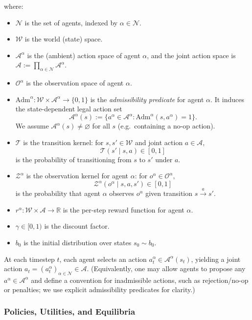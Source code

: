 where:
\begin{itemize}
    \item $\mathcal{N}$ is the set of agents, indexed by $\alpha\in \mathcal{N}$.
    \item $\mathcal{W}$ is the world (state) space.
    \item $\mathcal{A}^\alpha$ is the (ambient) action space of agent $\alpha$, and the joint action space is
    $\mathcal{A}:=\prod_{\alpha\in \mathcal{N}}\mathcal{A}^\alpha$.
    \item $\mathcal{O}^\alpha$ is the observation space of agent $\alpha$.
    \item $\mathrm{Adm}^\alpha:\mathcal{W}\times \mathcal{A}^\alpha\to\{0,1\}$ is the \emph{admissibility predicate} for agent $\alpha$.
    It induces the state-dependent legal action set
    \[
    \mathcal{A}^\alpha(s) := \{a^\alpha\in\mathcal{A}^\alpha : \mathrm{Adm}^\alpha(s,a^\alpha)=1\}.
    \]
    We assume $\mathcal{A}^\alpha(s)\neq\varnothing$ for all $s$ (e.g.\ containing a no-op action).
    \item $\mathcal{T}$ is the transition kernel: for $s,s'\in \mathcal{W}$ and joint action $a\in\mathcal{A}$,
    \[
    \mathcal{T}(s' \mid s,a)\in[0,1]
    \]
    is the probability of transitioning from $s$ to $s'$ under $a$.
    \item $\mathcal{Z}^\alpha$ is the observation kernel for agent $\alpha$: for $o^\alpha\in\mathcal{O}^\alpha$,
    \[
    \mathcal{Z}^\alpha(o^\alpha \mid s,a,s')\in[0,1]
    \]
    is the probability that agent $\alpha$ observes $o^\alpha$ given transition $s\xrightarrow{a}s'$.
    \item $r^\alpha:\mathcal{W}\times \mathcal{A}\to \mathbb{R}$ is the per-step reward function for agent $\alpha$.
    \item $\gamma\in[0,1)$ is the discount factor.
    \item $b_0$ is the initial distribution over states $s_0\sim b_0$.
\end{itemize}

At each timestep $t$, each agent selects an action $a_t^\alpha\in \mathcal{A}^\alpha(s_t)$, yielding a joint action
$a_t=(a_t^\alpha)_{\alpha\in\mathcal{N}}\in\mathcal{A}$.
(Equivalently, one may allow agents to propose any $a^\alpha\in\mathcal{A}^\alpha$ and define a convention for inadmissible actions,
such as rejection/no-op or penalties; we use explicit admissibility predicates for clarity.)

\subsubsection{Policies, Utilities, and Equilibria}

